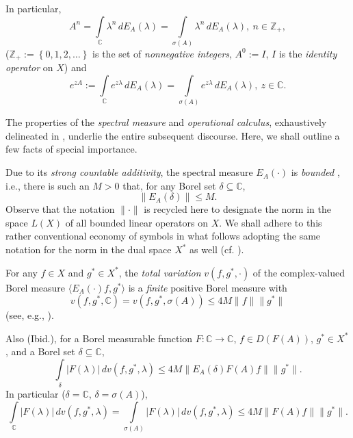 \documentclass{amsart}
\theoremstyle{plain}
\theoremstyle{definition}
\begin{document}
In particular,
\begin{equation}\label{power}
A^n=\int\limits_{{\mathbb C}} \lambda^n\,dE_A(\lambda)
=\int\limits_{\sigma(A)} \lambda^n\,dE_A(\lambda),\ n\in{{\mathbb Z}}_+,
\end{equation}
(${{\mathbb Z}}_+:=\left\{0,1,2,\dots\right\}$ is the set of \textit{nonnegative integers}, $A^0:=I$, $I$ is the \textit{identity operator} on $X$) and
\begin{equation}\label{exp}
e^{zA}:=\int\limits_{{\mathbb C}} e^{z\lambda}\,dE_A(\lambda)
=\int\limits_{\sigma(A)} e^{z\lambda}\,dE_A(\lambda),\ z\in{{\mathbb C}}.
\end{equation}

The properties of the {\it spectral measure} and {\it operational calculus}, exhaustively delineated in \cite{Survey58,Dun-SchIII}, underlie the entire subsequent discourse. Here, we shall outline a few facts of special importance.

Due to its {\it strong countable additivity}, the spectral measure $E_A(\cdot)$ is {\it bounded} \cite{Dun-SchI,Dun-SchIII}, i.e., there is such an $M>0$ that, for any Borel set $\delta\subseteq {{\mathbb C}}$,
\begin{equation}\label{bounded}
\|E_A(\delta)\|\le M.
\end{equation}
Observe that the notation $\|\cdot\|$ is recycled here to designate the norm in the space $L(X)$ of all bounded linear operators on $X$. We shall adhere to this rather conventional economy of symbols in what follows adopting the same notation for the norm in the dual space $X^*$ as well (cf. \cite{Engel-Nagel,Markin2002(2)}). 

For any $f\in X$ and $g^*\in X^*$, the \textit{total variation} $v(f,g^*,\cdot)$ of the complex-valued Borel measure $\langle E_A(\cdot)f,g^* \rangle$ is a {\it finite} positive Borel measure with
\begin{equation}\label{tv}
v(f,g^*,{{\mathbb C}})=v(f,g^*,\sigma(A))\le 4M\|f\|\|g^*\|
\end{equation}
(see, e.g., \cite{Markin2004(1),Markin2004(2)}).

Also (Ibid.), for a Borel measurable function $F:{{\mathbb C}}\to {{\mathbb C}}$, $f\in D(F(A))$, $g^*\in X^*$, and a Borel set $\delta\subseteq {{\mathbb C}}$,
\begin{equation}\label{cond(ii)}
\int\limits_\delta|F(\lambda)|\,dv(f,g^*,\lambda)
\le 4M\|E_A(\delta)F(A)f\|\|g^*\|.
\end{equation}
In particular ($\delta={{\mathbb C}}$, $\delta=\sigma(A)$),
\begin{equation}\label{cond(i)}
\int\limits_{{\mathbb C}}|F(\lambda)|\,d v(f,g^*,\lambda)
=\int\limits_{\sigma(A)}|F(\lambda)|\,d v(f,g^*,\lambda)\le 4M\|F(A)f\|\|g^*\|.
\end{equation}
\end{document}
